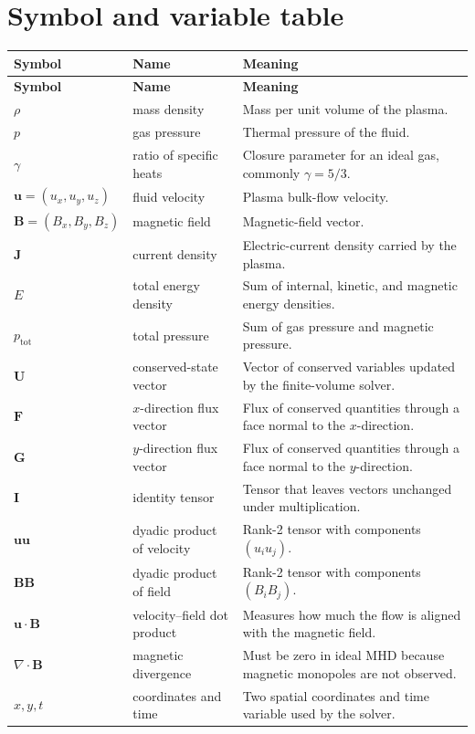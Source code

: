 \documentclass[11pt]{article}
\newcommand{\uvec}{\mathbf{u}}
\newcommand{\Bvec}{\mathbf{B}}
\newcommand{\Jvec}{\mathbf{J}}
\newcommand{\Uvec}{\mathbf{U}}
\newcommand{\Fvec}{\mathbf{F}}
\newcommand{\Gvec}{\mathbf{G}}
\newcommand{\Iten}{\mathbf{I}}
\newcommand{\ptot}{p_{\mathrm{tot}}}
\begin{document}
\section{Symbol and variable table}
\begin{longtable}{>{\raggedright\arraybackslash}p{} >{\raggedright\arraybackslash}p{} >{\raggedright\arraybackslash}p{}}
\toprule
\textbf{Symbol} & \textbf{Name} & \textbf{Meaning} \\
\midrule
\endfirsthead
\toprule
\textbf{Symbol} & \textbf{Name} & \textbf{Meaning} \\
\midrule
\endhead
$\rho$ & mass density & Mass per unit volume of the plasma. \\
$p$ & gas pressure & Thermal pressure of the fluid. \\
$\gamma$ & ratio of specific heats & Closure parameter for an ideal gas, commonly $\gamma=5/3$. \\
$\uvec=(u_x,u_y,u_z)$ & fluid velocity & Plasma bulk-flow velocity. \\
$\Bvec=(B_x,B_y,B_z)$ & magnetic field & Magnetic-field vector. \\
$\Jvec$ & current density & Electric-current density carried by the plasma. \\
$E$ & total energy density & Sum of internal, kinetic, and magnetic energy densities. \\
$\ptot$ & total pressure & Sum of gas pressure and magnetic pressure. \\
$\Uvec$ & conserved-state vector & Vector of conserved variables updated by the finite-volume solver. \\
$\Fvec$ & $x$-direction flux vector & Flux of conserved quantities through a face normal to the $x$-direction. \\
$\Gvec$ & $y$-direction flux vector & Flux of conserved quantities through a face normal to the $y$-direction. \\
$\Iten$ & identity tensor & Tensor that leaves vectors unchanged under multiplication. \\
$\uvec\uvec$ & dyadic product of velocity & Rank-2 tensor with components $(u_i u_j)$. \\
$\Bvec\Bvec$ & dyadic product of field & Rank-2 tensor with components $(B_i B_j)$. \\
$\uvec\cdot\Bvec$ & velocity--field dot product & Measures how much the flow is aligned with the magnetic field. \\
$\nabla\cdot\Bvec$ & magnetic divergence & Must be zero in ideal MHD because magnetic monopoles are not observed. \\
$x,y,t$ & coordinates and time & Two spatial coordinates and time variable used by the solver. \\
\bottomrule
\end{longtable}
\end{document}
